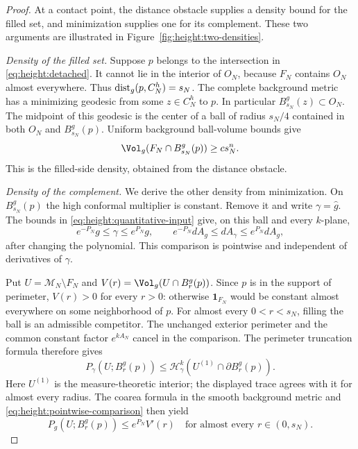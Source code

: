 \begin{proof}
At a contact point, the distance obstacle supplies a density bound for
the filled set, and minimization supplies one for its complement.
These two arguments are illustrated in Figure~\ref{fig:height:two-densities}.

\medskip\noindent\emph{Density of the filled set.}
Suppose $p$ belongs to the intersection in
\eqref{eq:height:detached}.  It cannot lie in the
interior of $O_N$, because $F_N$ contains $O_N$ almost everywhere.
Thus $\operatorname{dist}_g(p,C_N^h)=s_N$.  The complete background metric has a
minimizing geodesic from some $z\in C_N^h$ to $p$.  In particular
$B^g_{s_N}(z)\subset O_N$.  The midpoint of this geodesic is the
center of a ball of radius $s_N/4$ contained in both $O_N$ and
$B^g_{s_N}(p)$.  Uniform background ball-volume bounds give
\begin{equation}\label{eq:height:filled-density}
 \Vol_g(F_N\cap B^g_{s_N}(p))\ge c s_N^n.
\end{equation}
This is the filled-side density, obtained from the distance obstacle.

\medskip\noindent\emph{Density of the complement.}
We derive the other density from minimization.  On $B^g_{s_N}(p)$
the high conformal multiplier is constant.  Remove it and write
$\gamma=\widehat g$.  The bounds in \eqref{eq:height:quantitative-input}
give, on this ball and every $k$-plane,
\begin{equation}\label{eq:height:pointwise-comparison}
 e^{-P_N}g\le\gamma\le e^{P_N}g,
 \qquad e^{-P_N}dA_g\le dA_\gamma\le e^{P_N}dA_g,
\end{equation}
after changing the polynomial.  This comparison is pointwise and
independent of derivatives of $\gamma$.

Put $U=\mathcal M_N\setminus F_N$ and
$V(r)=\Vol_g(U\cap B^g_r(p))$.  Since $p$ is in the support of
perimeter, $V(r)>0$ for every $r>0$: otherwise $\mathbf1_{F_N}$
would be constant almost everywhere on some neighborhood of $p$.
For almost every $0<r<s_N$, filling the ball is an admissible
competitor.  The unchanged exterior perimeter and the common constant
factor $e^{kA_N}$ cancel in the comparison.  The perimeter truncation
formula therefore gives
\[
 P_\gamma(U;B^g_r(p))
 \le\mathcal H^k_\gamma(U^{(1)}\cap\partial B^g_r(p)).
\]
Here $U^{(1)}$ is the measure-theoretic interior; the displayed trace
agrees with it for almost every radius.  The coarea formula in the
smooth background metric and \eqref{eq:height:pointwise-comparison}
then yield
\begin{equation}\label{eq:height:one-sided-perimeter}
 P_g(U;B^g_r(p))\le e^{P_N}V'(r)
 \quad\text{for almost every }r\in(0,s_N).
\end{equation}


\end{proof}

